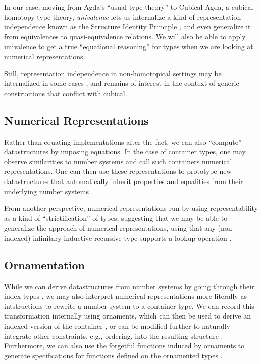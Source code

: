 \documentclass{article}
\theoremstyle{plain}%
\theoremstyle{definition}
\begin{document}
In our case, moving from Agda's ``usual type theory'' to Cubical Agda, a cubical homotopy type theory, \textit{univalence} \cite{cuagda} lets us internalize a kind of representation independence known as the Structure Identity Principle \cite{iri}, and even generalize it from equivalences to quasi-equivalence relations. We will also be able to apply univalence to get a true ``equational reasoning'' for types when we are looking at numerical representations.

Still, representation independence in non-homotopical settings may be internalized in some cases \cite{tgalois}, and remains of interest in the context of generic constructions that conflict with cubical.

\subsection{Numerical Representations}
Rather than equating implementations after the fact, we can also ``compute'' datastructures by imposing equations. In the case of container types, one may observe similarities to number systems \cite{purelyfunctional} and call such containers numerical representations. One can then use these representations to prototype new datastructures that automatically inherit properties and equalities from their underlying number systems \cite{calcdata}.

From another perspective, numerical representations run by using representability as a kind of ``strictification'' of types, suggesting that we may be able to generalize the approach of numerical representations, using that any (non-indexed) infinitary inductive-recursive type supports a lookup operation \cite{glookup}.


\subsection{Ornamentation}
While we can derive datastructures from number systems by going through their index types \cite{calcdata}, we may also interpret numerical representations more literally as intstructions to rewrite a number system to a container type. We can record this transformation internally using ornaments, which can then be used to derive an indexed version of the container \cite{algorn}, or can be modified further to naturally integrate other constraints, e.g., ordering, into the resulting structure \cite{progorn}. Furthermore, we can also use the forgetful functions induced by ornaments to generate specifications for functions defined on the ornamented types \cite{orntrans}.
\end{document}
